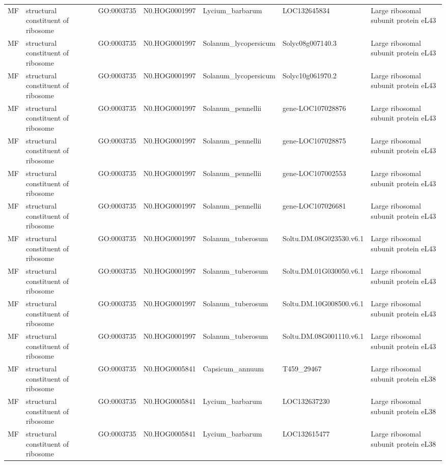 \begin{table}
\begin{tabular}[t]{lllllll}
MF & structural constituent of ribosome & GO:0003735 & N0.HOG0001997 & Lycium\_barbarum & LOC132645834 & Large ribosomal subunit protein eL43\\
MF & structural constituent of ribosome & GO:0003735 & N0.HOG0001997 & Solanum\_lycopersicum & Solyc08g007140.3 & Large ribosomal subunit protein eL43\\
MF & structural constituent of ribosome & GO:0003735 & N0.HOG0001997 & Solanum\_lycopersicum & Solyc10g061970.2 & Large ribosomal subunit protein eL43\\
MF & structural constituent of ribosome & GO:0003735 & N0.HOG0001997 & Solanum\_pennellii & gene-LOC107028876 & Large ribosomal subunit protein eL43\\
MF & structural constituent of ribosome & GO:0003735 & N0.HOG0001997 & Solanum\_pennellii & gene-LOC107028875 & Large ribosomal subunit protein eL43\\
MF & structural constituent of ribosome & GO:0003735 & N0.HOG0001997 & Solanum\_pennellii & gene-LOC107002553 & Large ribosomal subunit protein eL43\\
MF & structural constituent of ribosome & GO:0003735 & N0.HOG0001997 & Solanum\_pennellii & gene-LOC107026681 & Large ribosomal subunit protein eL43\\
MF & structural constituent of ribosome & GO:0003735 & N0.HOG0001997 & Solanum\_tuberosum & Soltu.DM.08G023530.v6.1 & Large ribosomal subunit protein eL43\\
MF & structural constituent of ribosome & GO:0003735 & N0.HOG0001997 & Solanum\_tuberosum & Soltu.DM.01G030050.v6.1 & Large ribosomal subunit protein eL43\\
MF & structural constituent of ribosome & GO:0003735 & N0.HOG0001997 & Solanum\_tuberosum & Soltu.DM.10G008500.v6.1 & Large ribosomal subunit protein eL43\\
MF & structural constituent of ribosome & GO:0003735 & N0.HOG0001997 & Solanum\_tuberosum & Soltu.DM.08G001110.v6.1 & Large ribosomal subunit protein eL43\\
MF & structural constituent of ribosome & GO:0003735 & N0.HOG0005841 & Capsicum\_annuum & T459\_29467 & Large ribosomal subunit protein eL38\\
MF & structural constituent of ribosome & GO:0003735 & N0.HOG0005841 & Lycium\_barbarum & LOC132637230 & Large ribosomal subunit protein eL38\\
MF & structural constituent of ribosome & GO:0003735 & N0.HOG0005841 & Lycium\_barbarum & LOC132615477 & Large ribosomal subunit protein eL38\\

\end{tabular}
\end{table}
